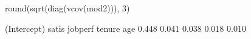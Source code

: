 \begin{Schunk}
\begin{Sinput}
 round(sqrt(diag(vcov(mod2))), 3)
\end{Sinput}
\begin{Soutput}
(Intercept)       satis     jobperf      tenure         age 
      0.448       0.041       0.038       0.018       0.010 
\end{Soutput}
\end{Schunk}
